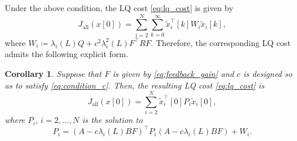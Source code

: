 \documentclass[letterpaper,10pt,conference]{ieeeconf}
\newtheorem{corollary}{Corollary}
\begin{document}
Under the above condition, the LQ cost \eqref{eq:lq_cost} is given by
\begin{equation}
  J_{\mathrm{all}}(x[0])
  =
  \sum_{i=2}^{N} \sum_{k=0}^{\infty}
  \tilde{x}_i^\top[k]W_i\tilde{x}_i[k],
\end{equation}
where $W_i \coloneqq \lambda_i(L)Q + c^2\lambda_i^2(L)F^\top RF$.
Therefore, the corresponding LQ cost admits the following explicit form.

\begin{corollary} \label{cor:lq_cost_alltime}
  Suppose that $F$ is given by \eqref{eq:feedback_gain} and $c$ is designed so as to satisfy \eqref{eq:condition_c}.
  Then, the resulting LQ cost \eqref{eq:lq_cost} is
  \begin{equation} \label{eq:lq_cost_alltime}
    J_{\mathrm{all}}(x[0]) = \sum_{i=2}^{N} \tilde{x}_i^\top[0] P_i \tilde{x}_i[0],
  \end{equation}
  where $P_i,\, i=2,\dots,N$ is the solution to
  \begin{equation} \label{eq:lyapunov_eq_Pi}
    P_i = \left(A - c\lambda_i(L)BF\right)^\top P_i \left(A - c\lambda_i(L)BF\right) + W_i.
  \end{equation}
\end{corollary}
\end{document}
